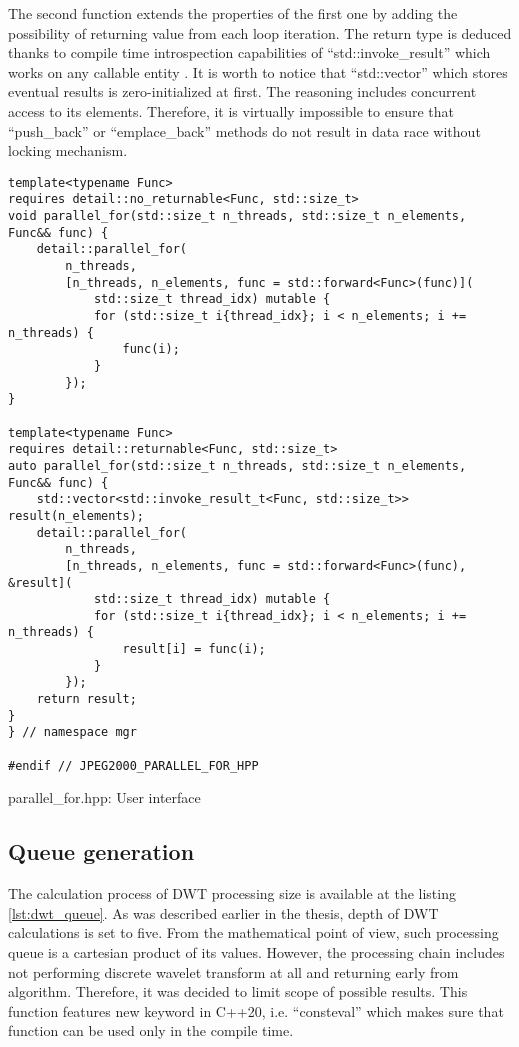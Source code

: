 The second function extends the properties of the first one by adding the possibility of returning
value from each loop iteration. The return type is deduced thanks to compile time introspection
capabilities of ``std::invoke\_result'' which works on any callable entity \cite{cppreference}. 
It is worth to notice that ``std::vector'' which stores eventual results is zero-initialized
at first. The reasoning includes concurrent access to its elements. Therefore, it is virtually
impossible to ensure that ``push\_back'' or ``emplace\_back'' methods do not result in data race
without locking mechanism.

\begin{listing}[!htb]
\begin{verbatim}
template<typename Func>
requires detail::no_returnable<Func, std::size_t>
void parallel_for(std::size_t n_threads, std::size_t n_elements, Func&& func) {
    detail::parallel_for(
        n_threads,
        [n_threads, n_elements, func = std::forward<Func>(func)](
            std::size_t thread_idx) mutable {
            for (std::size_t i{thread_idx}; i < n_elements; i += n_threads) {
                func(i);
            }
        });
}

template<typename Func>
requires detail::returnable<Func, std::size_t>
auto parallel_for(std::size_t n_threads, std::size_t n_elements, Func&& func) {
    std::vector<std::invoke_result_t<Func, std::size_t>> result(n_elements);
    detail::parallel_for(
        n_threads,
        [n_threads, n_elements, func = std::forward<Func>(func), &result](
            std::size_t thread_idx) mutable {
            for (std::size_t i{thread_idx}; i < n_elements; i += n_threads) {
                result[i] = func(i);
            }
        });
    return result;
}
} // namespace mgr

#endif // JPEG2000_PARALLEL_FOR_HPP
\end{verbatim}
\caption{parallel\_for.hpp: User interface}
\label{lst:parallel_for_user_interface}
\end{listing}

\subsection{Queue generation}

The calculation process of DWT processing size is available at the listing \ref{lst:dwt_queue}.
As was described earlier in the thesis, depth of DWT calculations is set to five. From the
mathematical point of view, such processing queue is a cartesian product of its values.
However, the processing chain includes not performing discrete wavelet transform at all
and returning early from algorithm. Therefore, it was decided to limit scope of possible
results. This function features new keyword in C++20, i.e. ``consteval'' which makes sure
that function can be used only in the compile time.


